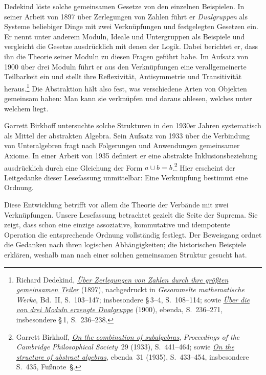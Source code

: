 Dedekind löste solche gemeinsamen Gesetze von den einzelnen
Beispielen. In seiner Arbeit von 1897 über Zerlegungen von Zahlen
führt er \emph{Dualgruppen} als Systeme beliebiger Dinge mit
zwei Verknüpfungen und festgelegten Gesetzen ein. Er nennt unter
anderem Moduln, Ideale und Untergruppen als Beispiele und
vergleicht die Gesetze ausdrücklich mit denen der Logik.
Dabei berichtet er, dass ihn die Theorie seiner Moduln zu
diesen Fragen geführt habe. Im Aufsatz von 1900 über drei
Moduln führt er aus den Verknüpfungen eine verallgemeinerte
Teilbarkeit ein und stellt ihre Reflexivität, Antisymmetrie
und Transitivität heraus.\footnote{Richard Dedekind,
\href{https://rcin.org.pl/Content/140714/PDF/WA35_171681_15883-2_Art9.pdf}{\emph{Über Zerlegungen von Zahlen durch ihre größten gemeinsamen Teiler}}
(1897), nachgedruckt in \emph{Gesammelte mathematische Werke},
Bd.~II, S.~103--147; insbesondere \S\,3--4, S.~108--114;
sowie \href{https://rcin.org.pl/Content/140716/PDF/WA35_171699_15883-2_Art11.pdf}{\emph{Über die von drei Moduln erzeugte Dualgruppe}}
(1900), ebenda, S.~236--271, insbesondere \S\,1, S.~236--238.}
Die Abstraktion hält also fest, was verschiedene Arten von
Objekten gemeinsam haben: Man kann sie verknüpfen und daraus
ablesen, welches unter welchem liegt.

\par{}
Garrett Birkhoff untersuchte solche Strukturen in den 1930er
Jahren systematisch als Mittel der abstrakten Algebra. Sein
Aufsatz von 1933 über die Verbindung von Unteralgebren fragt
nach Folgerungen und Anwendungen gemeinsamer Axiome. In einer
Arbeit von 1935 definiert er eine abstrakte Inklusionsbeziehung
ausdrücklich durch eine Gleichung der Form
\mbox{\(a\cup b=b\)}.\footnote{Garrett Birkhoff,
\href{https://doi.org/10.1017/S0305004100011464}{\emph{On the combination of subalgebras}},
\emph{Proceedings of the Cambridge Philosophical Society}~29
(1933), S.~441--464; sowie
\href{https://doi.org/10.1017/S0305004100013463}{\emph{On the structure of abstract algebras}},
ebenda~31 (1935), S.~433--454, insbesondere S.~435, Fußnote~\S.}
Hier erscheint der Leitgedanke dieser Lesefassung unmittelbar:
Eine Verknüpfung bestimmt eine Ordnung.

Diese Entwicklung betrifft vor allem die Theorie der Verbände
mit zwei Verknüpfungen. Unsere Lesefassung betrachtet gezielt
die Seite der Suprema. Sie zeigt, dass schon eine einzige
assoziative, kommutative und idempotente Operation die
entsprechende Ordnung vollständig festlegt. Der Beweisgang
ordnet die Gedanken nach ihren logischen Abhängigkeiten;
die historischen Beispiele erklären, weshalb man nach einer
solchen gemeinsamen Struktur gesucht hat.

